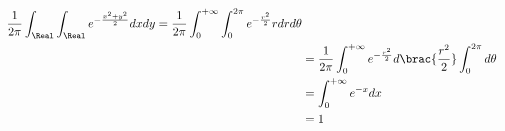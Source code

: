 \begin{align*}\frac{1}{2\pi}\int_\Real \int_\Real e^{-\frac{x^2+y^2}{2}}dxdy
 =\frac{1}{2\pi}\int_0^{+\infty} \int_0^{2\pi} e^{-\frac{r^2}{2}} r dr d\theta\\
&=\frac{1}{2\pi}\int_0^{+\infty} e^{-\frac{r^2}{2}} d\brac{\frac{r^2}{2}} \int_0^{2\pi}d\theta\\
&=\int_0^{+\infty} e^{-x} dx \\
&=1 \end{align*}












